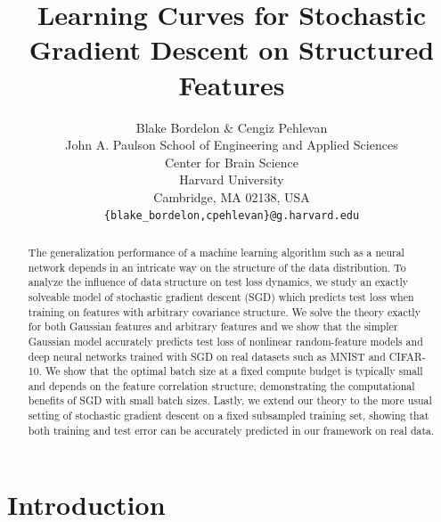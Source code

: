 \documentclass{article} %
\title{Learning Curves for Stochastic Gradient Descent on Structured Features}
\author{Blake Bordelon \& Cengiz Pehlevan
\\
John A. Paulson School of Engineering and Applied Sciences\\
Center for Brain Science\\
Harvard University\\
Cambridge, MA 02138, USA \\
\texttt{\{blake\_bordelon,cpehlevan\}@g.harvard.edu} \\
}
\newcommand{\bb}[1]{\textcolor{red}{[Blake: #1]}}
\begin{document}
\maketitle

\begin{abstract}
 The generalization performance of a machine learning algorithm such as a neural network depends in an intricate way on the structure of the data distribution. To analyze the influence of data structure on test loss dynamics, we study an exactly solveable model of stochastic gradient descent (SGD) which predicts test loss when training on features with arbitrary covariance structure. We solve the theory exactly for both Gaussian features and arbitrary features and we show that the simpler Gaussian model accurately predicts test loss of nonlinear random-feature models and deep neural networks trained with SGD on real datasets such as MNIST and CIFAR-10. We show that the optimal batch size at a fixed compute budget is typically small and depends on the feature correlation structure, demonstrating the computational benefits of SGD with small batch sizes. Lastly, we extend our theory to the more usual setting of stochastic gradient descent on a fixed subsampled training set, showing that both training and test error can be accurately predicted in our framework on real data.
\end{abstract}



\section{Introduction}

\end{document}
